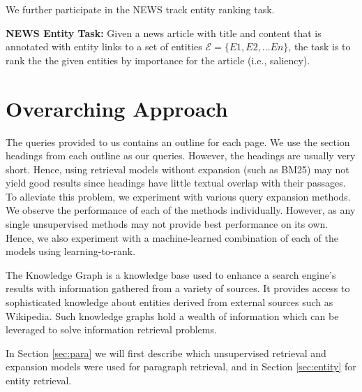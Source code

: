 \documentclass{article}
\begin{document}
\noindent We further participate in the NEWS track entity ranking task. 

\noindent \textbf{NEWS Entity Task:} Given a news article with title and content that is annotated with entity links to a set of entities  $\mathcal{E}=\{E1, E2, ... En\}$, the task is to rank the the given entities by importance for the article (i.e., saliency). 

\medskip 

\section{Overarching Approach}
The queries provided to us contains an outline for each page. We use the section headings from each outline as our queries. However, the headings are usually very short. Hence, using retrieval models without expansion (such as BM25) may not yield good results since headings have little textual overlap with their passages. To alleviate this problem, we experiment with various query expansion methods. We observe the performance of each of the methods individually. However, as any single unsupervised methods may not provide best performance on its own. Hence, we also experiment with a machine-learned combination of each of the models using learning-to-rank. 

The Knowledge Graph is a knowledge base used to enhance a search engine's results with information gathered from a variety of sources. It provides access to sophisticated knowledge about entities derived from external sources such as Wikipedia. Such knowledge graphs hold a wealth of information which can be leveraged to solve information retrieval problems. 

In Section \ref{sec:para} we will first describe which unsupervised retrieval and expansion models were used for paragraph retrieval, and in Section \ref{sec:entity} for entity retrieval.  

\end{document}

